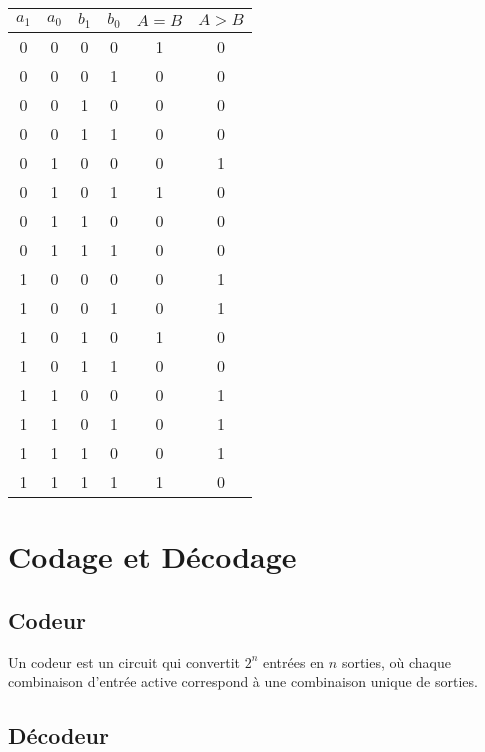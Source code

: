 \documentclass[10pt,a4paper]{article}
\begin{document}
\begin{center}
    \begin{tabular}{|c|c|c|c|c|c|}
    \hline
    \( a_1 \) & \( a_0 \) & \( b_1 \) & \( b_0 \) & \( A = B \) & \( A > B \) \\
    \hline
    0 & 0 & 0 & 0 & 1 & 0 \\
    0 & 0 & 0 & 1 & 0 & 0 \\
    0 & 0 & 1 & 0 & 0 & 0 \\
    0 & 0 & 1 & 1 & 0 & 0 \\
    0 & 1 & 0 & 0 & 0 & 1 \\
    0 & 1 & 0 & 1 & 1 & 0 \\
    0 & 1 & 1 & 0 & 0 & 0 \\
    0 & 1 & 1 & 1 & 0 & 0 \\
    1 & 0 & 0 & 0 & 0 & 1 \\
    1 & 0 & 0 & 1 & 0 & 1 \\
    1 & 0 & 1 & 0 & 1 & 0 \\
    1 & 0 & 1 & 1 & 0 & 0 \\
    1 & 1 & 0 & 0 & 0 & 1 \\
    1 & 1 & 0 & 1 & 0 & 1 \\
    1 & 1 & 1 & 0 & 0 & 1 \\
    1 & 1 & 1 & 1 & 1 & 0 \\
    \hline
    \end{tabular}
\end{center}


\section*{Codage et Décodage}

\subsection*{Codeur}

Un codeur est un circuit qui convertit \( 2^n \) entrées en \( n \) sorties, où chaque combinaison d'entrée active correspond à une combinaison unique de sorties.

\subsection*{Décodeur}
\end{document}
